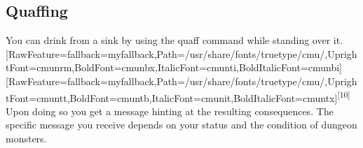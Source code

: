 \subsection{Quaffing}
\label{3}
You can drink from a sink by using the quaff\footnotemark[62] command while standing over it.\allowbreak{}\setmainfont{cmunrm.ttf}[RawFeature={fallback=myfallback},Path=/usr/share/fonts/truetype/cmu/,UprightFont=cmunrm,BoldFont=cmunbx,ItalicFont=cmunti,BoldItalicFont=cmunbi]\setmonofont{cmunrm.ttf}[RawFeature={fallback=myfallback},Path=/usr/share/fonts/truetype/cmu/,UprightFont=cmuntt,BoldFont=cmuntb,ItalicFont=cmunit,BoldItalicFont=cmuntx]\textsuperscript{{$\text{[}$}10{$\text{]}$}} Upon doing so you get a message hinting at the resulting consequences. The specific message you receive depends on your status and the condition of dungeon monsters\footnotemark[63].





